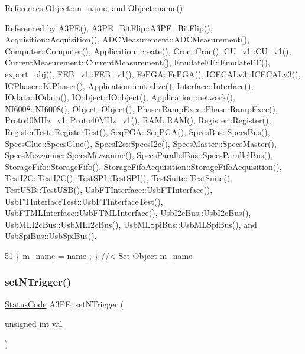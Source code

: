 References Object\+::m\+\_\+name, and Object\+::name().



Referenced by A3\+P\+E(), A3\+P\+E\+\_\+\+Bit\+Flip\+::\+A3\+P\+E\+\_\+\+Bit\+Flip(), Acquisition\+::\+Acquisition(), A\+D\+C\+Measurement\+::\+A\+D\+C\+Measurement(), Computer\+::\+Computer(), Application\+::create(), Croc\+::\+Croc(), C\+U\+\_\+v1\+::\+C\+U\+\_\+v1(), Current\+Measurement\+::\+Current\+Measurement(), Emulate\+F\+E\+::\+Emulate\+F\+E(), export\+\_\+obj(), F\+E\+B\+\_\+v1\+::\+F\+E\+B\+\_\+v1(), Fe\+P\+G\+A\+::\+Fe\+P\+G\+A(), I\+C\+E\+C\+A\+Lv3\+::\+I\+C\+E\+C\+A\+Lv3(), I\+C\+Phaser\+::\+I\+C\+Phaser(), Application\+::initialize(), Interface\+::\+Interface(), I\+Odata\+::\+I\+Odata(), I\+Oobject\+::\+I\+Oobject(), Application\+::network(), N\+I6008\+::\+N\+I6008(), Object\+::\+Object(), Phaser\+Ramp\+Exec\+::\+Phaser\+Ramp\+Exec(), Proto40\+M\+Hz\+\_\+v1\+::\+Proto40\+M\+Hz\+\_\+v1(), R\+A\+M\+::\+R\+A\+M(), Register\+::\+Register(), Register\+Test\+::\+Register\+Test(), Seq\+P\+G\+A\+::\+Seq\+P\+G\+A(), Specs\+Bus\+::\+Specs\+Bus(), Specs\+Glue\+::\+Specs\+Glue(), Specs\+I2c\+::\+Specs\+I2c(), Specs\+Master\+::\+Specs\+Master(), Specs\+Mezzanine\+::\+Specs\+Mezzanine(), Specs\+Parallel\+Bus\+::\+Specs\+Parallel\+Bus(), Storage\+Fifo\+::\+Storage\+Fifo(), Storage\+Fifo\+Acquisition\+::\+Storage\+Fifo\+Acquisition(), Test\+I2\+C\+::\+Test\+I2\+C(), Test\+S\+P\+I\+::\+Test\+S\+P\+I(), Test\+Suite\+::\+Test\+Suite(), Test\+U\+S\+B\+::\+Test\+U\+S\+B(), Usb\+F\+T\+Interface\+::\+Usb\+F\+T\+Interface(), Usb\+F\+T\+Interface\+Test\+::\+Usb\+F\+T\+Interface\+Test(), Usb\+F\+T\+M\+L\+Interface\+::\+Usb\+F\+T\+M\+L\+Interface(), Usb\+I2c\+Bus\+::\+Usb\+I2c\+Bus(), Usb\+M\+L\+I2c\+Bus\+::\+Usb\+M\+L\+I2c\+Bus(), Usb\+M\+L\+Spi\+Bus\+::\+Usb\+M\+L\+Spi\+Bus(), and Usb\+Spi\+Bus\+::\+Usb\+Spi\+Bus().


\begin{DoxyCode}
51 \{ \hyperlink{classObject_a8b83c95c705d2c3ba0d081fe1710f48d}{m\_name}  = \hyperlink{classObject_a300f4c05dd468c7bb8b3c968868443c1}{name}  ; \} \textcolor{comment}{//< Set Object m\_name}
\end{DoxyCode}
\mbox{\label{classA3PE_a81db44ddfc42b67ed08756b113b8e122}} 
\subsubsection{\texorpdfstring{set\+N\+Trigger()}{setNTrigger()}}
{\footnotesize\ttfamily \hyperlink{classStatusCode}{Status\+Code} A3\+P\+E\+::set\+N\+Trigger (\begin{DoxyParamCaption}\item[{unsigned int}]{val }\end{DoxyParamCaption})}



